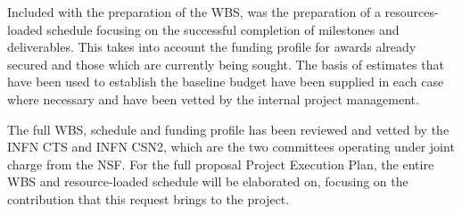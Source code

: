 Included with the preparation of the WBS, was the preparation of a resources-loaded schedule focusing on the successful completion of milestones and deliverables.  This takes into account the funding profile for awards already secured and those which are currently being sought.  The basis of estimates that have been used to establish the baseline budget have been supplied in each case where necessary and have been vetted by the internal project management.  

The full WBS, schedule and funding profile has been reviewed and vetted by the INFN CTS and INFN CSN2, which are the two committees operating under joint charge from the NSF.  For the full proposal Project Execution Plan, the entire WBS and resource-loaded schedule will be elaborated on, focusing on the contribution that this request brings to the project. 








